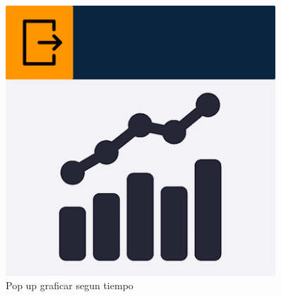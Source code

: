 \begin{figure}[H]
\begin{minipage}{0.45\textwidth}
      \label{fig:Datos ejercicio}
   \end{minipage}%
   \hspace{0.5cm}
   \begin{minipage}{0.45\textwidth}
      \centering
      \includegraphics[width=0.9\textwidth]{fotos/Frame 43.png}
      \caption{Pop up graficar segun tiempo}
      \label{fig:Pop up graficar segun tiempo}
   \end{minipage}
\end{figure}

